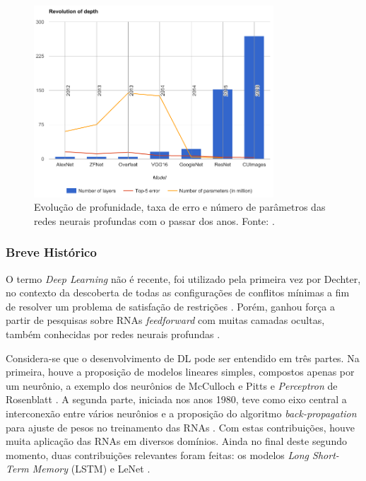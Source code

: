 \begin{figure}[ht]
	\centering
	\caption{Evolução de profunidade, taxa de erro e número de parâmetros das redes neurais profundas com o passar dos anos. Fonte: \cite{mediumcnn}.}
	\label{fig:compara_redes}
	\includegraphics[width=0.8\textwidth]{img/compara_redes.png}
\end{figure}

\subsubsection{Breve Histórico}

O termo \emph{Deep Learning} não é recente, foi utilizado pela primeira vez por Dechter, no contexto da descoberta de todas as configurações de conflitos mínimas a fim de resolver um problema de satisfação de restrições
\cite{dechter1986learning}. Porém, ganhou força a partir de pesquisas sobre RNAs \emph{feedforward} com muitas camadas ocultas, também conhecidas por redes neurais profundas \cite{deng2014deep}.


Considera-se que o desenvolvimento de DL pode ser entendido em três partes. Na primeira, houve a proposição de modelos lineares simples, compostos apenas por um neurônio, a exemplo dos neurônios de McCulloch e Pitts \cite{mcculloch1943logical} e \emph{Perceptron} de Rosenblatt  \cite{rosenblatt1958perceptron}. A segunda parte, iniciada nos anos 1980, teve como eixo central a interconexão entre vários neurônios e a proposição do algoritmo \emph{back-propagation} para ajuste de pesos no treinamento das RNAs  \cite{rumelhart1986parallel,rumelhart1986backpropagation}. Com estas contribuições, houve muita aplicação das RNAs em diversos domínios. Ainda no final deste segundo momento, duas contribuições relevantes foram feitas: os modelos \emph{Long Short-Term Memory} (LSTM) e LeNet \cite{lenet}.   

